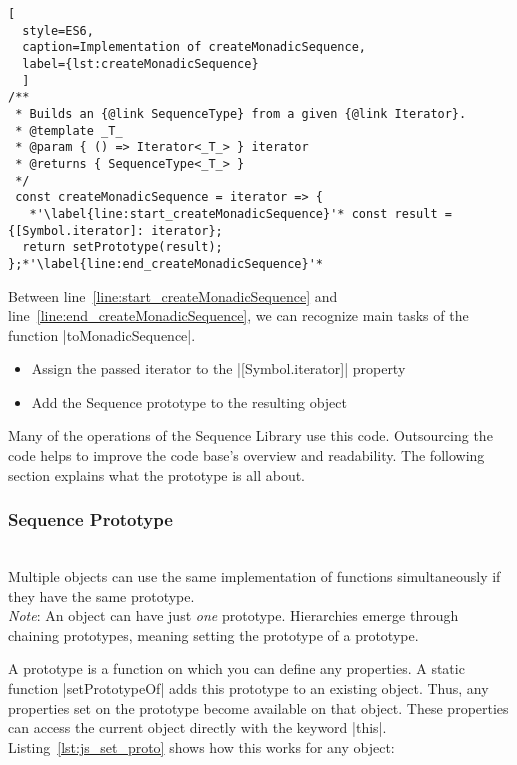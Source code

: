 \begin{lstlisting}[
  style=ES6, 
  caption=Implementation of createMonadicSequence,
  label={lst:createMonadicSequence}
  ]
/**
 * Builds an {@link SequenceType} from a given {@link Iterator}.
 * @template _T_
 * @param { () => Iterator<_T_> } iterator
 * @returns { SequenceType<_T_> }
 */
 const createMonadicSequence = iterator => {
   *'\label{line:start_createMonadicSequence}'* const result = {[Symbol.iterator]: iterator};
  return setPrototype(result);
};*'\label{line:end_createMonadicSequence}'*
\end{lstlisting}

Between line~\ref{line:start_createMonadicSequence} and 
line~\ref{line:end_createMonadicSequence}, we can recognize main tasks of the
function |toMonadicSequence|.

\begin{itemize}
  \item{Assign the passed iterator to the |[Symbol.iterator]| property}
  \item{Add the Sequence prototype to the resulting object}
\end{itemize}

Many of the operations of the Sequence Library use this code.
Outsourcing the code helps to improve the code base's overview and readability.
The following section explains what the prototype is all about.

\subsubsection{Sequence Prototype}
\label{subsub:Sequence Prototype}
\\ 
Multiple objects can use the same implementation of functions simultaneously if
they have the same prototype.\\
\textit{Note}: An object can have just \textit{one} prototype. Hierarchies
emerge through chaining prototypes, meaning setting the prototype of a
prototype.

A prototype is a function on which you can define any properties. A static
function |setPrototypeOf| adds this prototype to an existing object. Thus, any
properties set on the prototype become available on that object. These
properties can access the current object directly with the keyword |this|.
Listing~\ref{lst:js_set_proto} shows how this works for any object:

